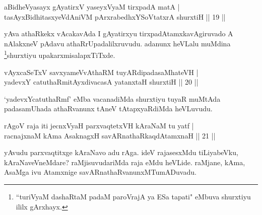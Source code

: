 
\begin{shl}
aBidheVyasayx gAyatirxV yaseyxVyaM tirxpadA matA | \\
tasAyxBidhitasxyeVdAniVM pArxrabedhxYSoVtatxrA shurxtiH \hfill ||  19 || 
\end{shl}

\begin{artha} 
yAva athaRkekx vAcakavAda I gAyatirxyu tirxpadAtamxkavAgiruvado A 
nAlakxneV pAdavu athaRrUpadalilxruvudu. adanunx heVLalu muMdina 
\footnote[1]{``turiVyaM dashaRtaM padaM paroVrajA ya ESa tapati" 
eMbuva shurxtiyu ililx gArxhayx.}shurxtiyu upakarxmisalapxTiTxde.
\end{artha}


\begin{shl}
vAyxcaSeTxV savxyameVvAthaRM tuyARdipadasaMhateVH | \\
yadevxY catuthaRmitAyxdivacasA yatanxtaH shurxtiH \hfill ||  20 || 
\end{shl}

\begin{artha} 
`yadevxYcatuthaRmf' eMba vacanadiMda shurxtiyu tuyaR muMtAda 
padasamUhada athaRvanunx tAneV tAtapxyaRdiMda heVLuvudu.
\end{artha}


\begin{shl}
rAgoV raja iti jecnxVyaH parxvaqtetxVH kAraNaM tu yatf  | \\
\footnotemark[1]{}racnajxnaM kAma AsaknagxH savARnathaRkaqdAtamxnaH \hfill ||  21 || 
\end{shl}

\begin{artha} 
yAvudu parxvaqtitxge kAraNavo adu rAga. ideV rajasesxMdu tiLiyabeVku, 
kAraNaveVneMdare? raMjisuvudariMda raja eMdu heVLide. raMjane, kAma, 
AsaMga ivu Atamxnige savARnathaRvanunxMTumADuvadu.
\end{artha}

